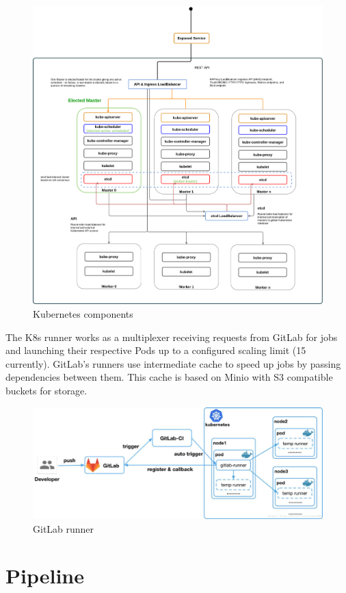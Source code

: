 \documentclass[a4paper,
	       keeplastbox,   %
	       References
	       ]{jacow}
\begin{document}
\begin{figure}[!htb]
	\centering
	\includegraphics*[width=0.8\columnwidth]{k8s}
	\caption{Kubernetes components}
	\label{fig:k8s}
\end{figure}

The K8s runner \cite{gitlabrunner} works as a multiplexer receiving requests from GitLab for jobs and launching their respective Pods up to a configured scaling limit (15 currently). GitLab's runners use intermediate cache to speed up jobs by passing dependencies between them. This cache is based on Minio\cite{minio} with S3\cite{s3} compatible buckets for storage.

\begin{figure}[!htb]
	\centering
	\includegraphics*[width=0.8\columnwidth]{gitlab-runner}
	\caption{GitLab runner}
	\label{fig:gitlab-runner}
\end{figure}


\section{Pipeline}
\end{document}
